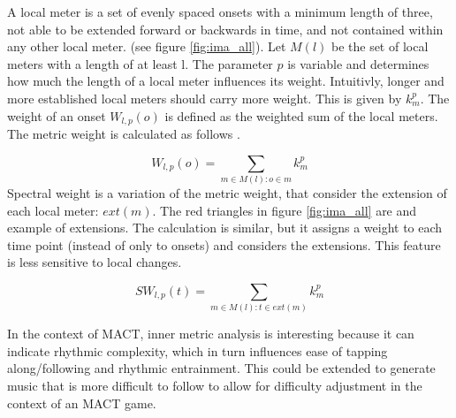A local meter is a set of evenly spaced onsets with a minimum length of three, not able to be extended forward or backwards in time, and not contained within any other local meter. (see figure \ref{fig:ima_all}). Let $M(l)$ be the set of local meters with a length of at least l. The parameter $p$ is variable and determines how much the length of a local meter influences its weight. Intuitivly, longer and more established local meters should carry more weight. This is given by $k_{m}^p$. The weight of an onset $W_{l,p}(o)$ is defined as the weighted sum of the local meters.  
The metric weight is calculated as follows \cite{Volk2008Syncopation}.  

\begin{equation}
    W_{l,p}(o) = \sum_{m \in M(l):o \in m}k_{m}^{p}
\end{equation} 
Spectral weight is a variation of the metric weight, that consider the extension of each local meter: $ext(m)$. The red triangles in figure \ref{fig:ima_all} are and example of extensions. The calculation is similar, but it assigns a weight to each time point (instead of only to onsets) and considers the extensions. This feature is less sensitive to local changes.

\begin{equation}
    SW_{l,p}(t) = \sum_{m \in M(l):t \in ext(m)}k_{m}^{p}
\end{equation}

In the context of MACT, inner metric analysis is interesting because it can indicate rhythmic complexity, which in turn influences ease of tapping along/following \cite{Volk2008Syncopation} and rhythmic entrainment. This could be extended to generate music that is more difficult to follow to allow for difficulty adjustment in the context of an MACT game. 

